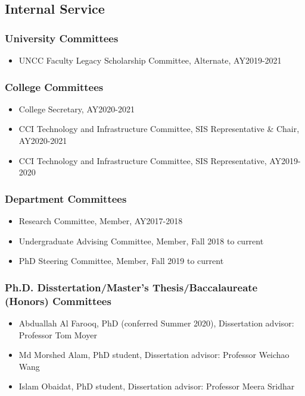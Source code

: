 
\hypertarget{internal-service}{%
\subsection{Internal Service}\label{internal-service}}

\hypertarget{university-committees}{%
\subsubsection{University Committees}\label{university-committees}}
\begin{itemize}
\item UNCC Faculty Legacy Scholarship Committee, Alternate, AY2019-2021
\end{itemize}

\hypertarget{college-committees}{%
\subsubsection{College Committees}\label{college-committees}}
\begin{itemize}
\item College Secretary, AY2020-2021
\item CCI Technology and Infrastructure Committee, SIS Representative \& Chair, AY2020-2021
\item CCI Technology and Infrastructure Committee, SIS Representative, AY2019-2020
\end{itemize}

\hypertarget{dept-committees}{%
\subsubsection{Department Committees}\label{dept-committees}}
\begin{itemize}
\item Research Committee, Member, AY2017-2018
\item Undergraduate Advising Committee, Member, Fall 2018 to current
\item PhD Steering Committee, Member, Fall 2019 to current
\end{itemize}

\hypertarget{thesis-committees}{%
\subsubsection{Ph.D. Disstertation/Master's Thesis/Baccalaureate (Honors) Committees}\label{thesis-committees}}
\begin{itemize}
\item Abduallah Al Farooq, PhD (conferred Summer 2020), Dissertation advisor: Professor Tom Moyer
\item Md Morshed Alam, PhD student, Dissertation advisor: Professor Weichao Wang
\item Islam Obaidat, PhD student, Dissertation advisor: Professor Meera Sridhar
\end{itemize}

